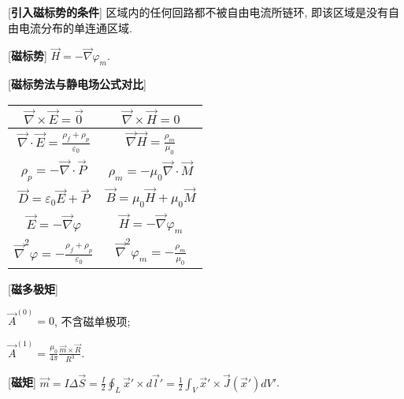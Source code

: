[\textbf{引入磁标势的条件}] 区域内的任何回路都不被自由电流所链环, 即该区域是没有自由电流分布的单连通区域.\par

[\textbf{磁标势}] $\vec H=-\vec\nabla\varphi_m$.\par

[\textbf{磁标势法与静电场公式对比}]\par
\begin{table}[htb]\begin{center}\begin{tabular}{c c}
       \hline $\vec\nabla\times\vec E=\vec 0$&$\vec\nabla\times\vec H=0$\\
       \hline $\vec\nabla\cdot \vec E=\frac{\rho_f+\rho_p}{\varepsilon_0}$ & $\vec\nabla\vec H=\frac{\rho_m}{\mu_0} $ \\
       \hline $\rho_p=-\vec\nabla\cdot\vec P$ & $\rho_m=-\mu_0\vec\nabla\cdot\vec M$ \\
       \hline $\vec D=\varepsilon_0\vec E+\vec P$ & $\vec B=\mu_0\vec H+\mu_0\vec M$ \\
       \hline $\vec E=-\vec\nabla\varphi$ & $\vec H=-\vec\nabla\varphi_m$ \\
       \hline $\vec\nabla^2\varphi =-\frac{\rho_f+\rho_p}{\varepsilon_0}$ & $\vec\nabla^2\varphi_m=-\frac{\rho_m}{\mu_0}$ \\
       \hline
       \end{tabular}\end{center}\end{table}\par

[\textbf{磁多极矩}]\par
\qquad $\vec A^{(0)}=0$, 不含磁单极项;\par
\qquad $\vec A^{(1)}=\frac{\mu_0}{4\pi}\frac{\vec m\times\vec R}{R^3}$.\par

[\textbf{磁矩}] $\vec m=I\Delta\vec S=\frac{I}{2}\oint_L\vec x'\times d\vec l'=\frac{1}{2}\int_V\vec x'\times\vec J(\vec x')dV'$.

\clearpage

